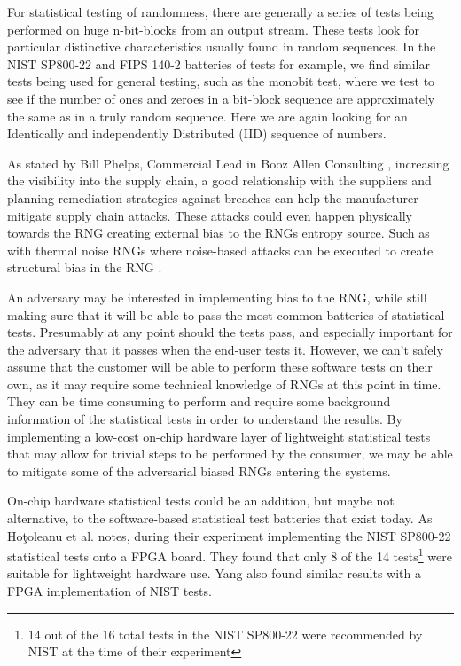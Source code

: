 \documentclass[]{final_report}
\begin{document}
\par{For statistical testing of randomness, there are generally a series of tests being performed on huge n-bit-blocks from an output stream. These tests look for particular distinctive characteristics usually found in random sequences. In the NIST SP800-22 and FIPS 140-2 batteries of tests for example, we find similar \cite{Smith:2020}\cite{Rukhin:2010} tests being used for general testing, such as the monobit test, where we test to see if the number of ones and zeroes in a bit-block sequence are approximately the same as in a truly random sequence. Here we are again looking for an Identically and independently Distributed (IID) sequence of numbers.}

\par{As stated by Bill Phelps, Commercial Lead in Booz Allen Consulting \cite{Phelps:2019}, increasing the visibility into the supply chain, a good relationship with the suppliers and planning remediation strategies against breaches can help the manufacturer mitigate supply chain attacks. These attacks could even happen physically towards the RNG creating external bias to the RNGs entropy source. Such as with thermal noise RNGs where noise-based attacks can be executed to create structural bias in the RNG \cite{Brown:2020}.}

\par{An adversary may be interested in implementing bias to the RNG, while still making sure that it will be able to pass the most common batteries of statistical tests. Presumably at any point should the tests pass, and especially important for the adversary that it passes when the end-user tests it. However, we can’t safely assume that the customer will be able to perform these software tests on their own, as it may require some technical knowledge of RNGs at this point in time. They can be time consuming to perform and require some background information of the statistical tests in order to understand the results. By implementing a low-cost on-chip hardware layer of lightweight statistical tests that may allow for trivial steps to be performed by the consumer, we may be able to mitigate some of the adversarial biased RNGs entering the systems.}

\par{On-chip hardware statistical tests could be an addition, but maybe not alternative, to the software-based statistical test batteries that exist today. As Hoţoleanu et al. \cite{Hotoleanu:2010} notes, during their experiment implementing the NIST SP800-22 statistical tests onto a FPGA board. They found that only 8 of the 14 tests\footnote{14 out of the 16 total tests in the NIST SP800-22 were recommended by NIST at the time of their experiment\cite{Hotoleanu:2010}} were suitable for lightweight hardware use. Yang\cite{Yang:2016} also found similar results with a FPGA implementation of NIST tests.}
\end{document}
